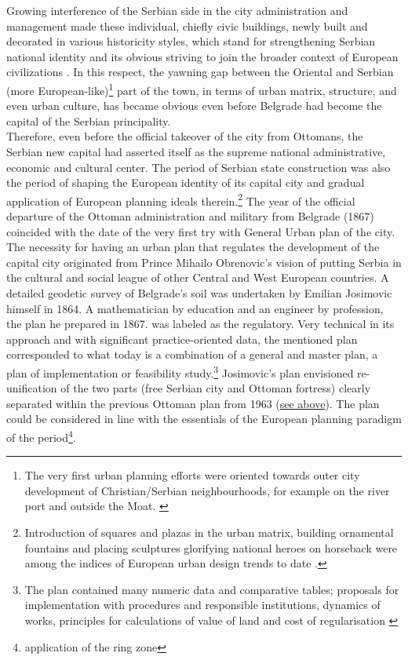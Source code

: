\documentclass[11pt]{report}
\begin{document}
Growing interference of the Serbian side in the city administration and management made these individual, chiefly civic buildings, newly built and decorated in various historicity styles, which stand for strengthening Serbian national identity and its obvious striving to join the broader context of European civilizations \href{ref}{\citealt{hirt_belgrade_2009}}.
In this respect, the yawning gap between the Oriental and Serbian (more European-like)\footnote{The very first urban planning efforts were oriented towards outer city development of Christian/Serbian neighbourhoods, for example on the river port and outside the Moat. \href{ref}{\citealt{blagojevic_urban_2009}}}
part of the town, in terms of urban matrix, structure, and even urban culture, has became obvious even before Belgrade had become the capital of the Serbian principality.
\\

Therefore, even before the official takeover of the city from Ottomans, the Serbian new capital had asserted itself as the supreme national administrative, economic and cultural center.
The period of Serbian state construction was also the period of shaping the European identity of its capital city and gradual application of European planning ideals therein.\footnote{Introduction of squares and plazas in the urban matrix, building ornamental fountains and placing sculptures glorifying national heroes on horseback were among the indices of European urban design trends to date \href{ref}{\citealt{hirt_belgrade_2009}}.}
The year of the official departure of the Ottoman administration and military from Belgrade (1867) coincided with the date of the very first try with General Urban plan of the city.
\\

The necessity for having an urban plan that regulates the development of the capital city originated from Prince Mihailo Obrenovic's vision of putting Serbia in the cultural and social league of other Central and West European countries.
A detailed geodetic survey of Belgrade's soil was undertaken by Emilian Josimovic himself in 1864.
A mathematician by education and an engineer by profession, the plan he prepared in 1867. was labeled as the regulatory.
Very technical in its approach and with significant practice-oriented data, the mentioned plan corresponded to what today is a combination of a general and master plan, a plan of implementation or feasibility study.\footnote{The plan contained many numeric data and comparative tables; proposals  for  implementation with procedures and responsible institutions, dynamics of works, principles for calculations of value of land and cost of regularisation \href{ref}{\citealt{blagojevic_urban_2009}}}
Josimovic's plan envisioned re-unification of the two parts (free Serbian city and Ottoman fortress) clearly separated within the previous Ottoman plan from 1963 (\href{see above}{see above}). The plan could be considered in line with the essentials of the European planning paradigm of the period\footnote{application of the ring zone}. 
\\
\end{document}

